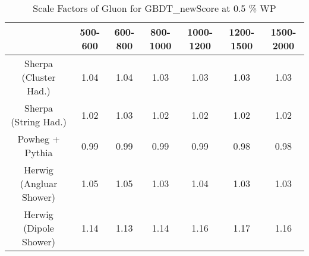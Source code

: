 \begin{table}
\centering
\caption{Scale Factors of Gluon for GBDT_newScore at 0.5 \% WP}
\label{tab:SF_MC_GBDT_newScore_0.5_Gluon}
\begin{tabular}{ccccccc}
\toprule
{} &  500-600 &  600-800 &  800-1000 &  1000-1200 &  1200-1500 &  1500-2000 \\
\midrule
Sherpa (Cluster Had.)   &     1.04 &     1.04 &      1.03 &       1.03 &       1.03 &       1.03 \\
Sherpa (String Had.)    &     1.02 &     1.03 &      1.02 &       1.02 &       1.02 &       1.02 \\
Powheg + Pythia         &     0.99 &     0.99 &      0.99 &       0.99 &       0.98 &       0.98 \\
Herwig (Angluar Shower) &     1.05 &     1.05 &      1.03 &       1.04 &       1.03 &       1.03 \\
Herwig (Dipole Shower)  &     1.14 &     1.13 &      1.14 &       1.16 &       1.17 &       1.16 \\
\bottomrule
\end{tabular}
\end{table}
